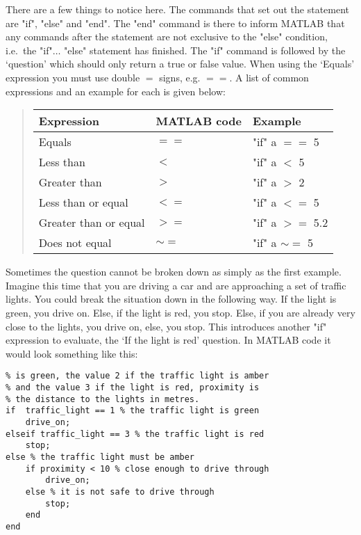 \documentclass[12pt,a4paper]{article}
\begin{document}
There are a few things to notice here.  The commands that set out the statement are "if", "else" and "end".  
The "end" command is there to inform MATLAB that any commands after the statement are not exclusive to the "else" condition, i.e.~the "if"$\ldots$ "else" statement has finished.  
The "if" command is followed by the `question' which should only return a true or false value.  
When using the `Equals' expression you must use double $=$ signs, e.g. $==$.  
A list of common expressions and an example for each is given below:

\begin{quotation}
\begin{tabular}{l l l}
\toprule
Expression & MATLAB code & Example \\
\midrule
Equals & $==$ & "if" a $==$ 5\\
Less than & $<$ & "if" a $<$ 5\\
Greater than & $>$ & "if" a $>$ 2\\
Less than or equal & $<=$ & "if" a $<=$ 5\\
Greater than or equal & $>=$ & "if" a $>=$ 5.2\\
Does not equal & $\sim =$ & "if" a $\sim =$ 5\\
\bottomrule
\end{tabular}
\end{quotation}

Sometimes the question cannot be broken down as simply as the first example.  
Imagine this time that you are driving a car and are approaching a set of traffic lights.  
You could break the situation down in the following way.  
If the light is green, you drive on.  
Else, if the light is red, you stop.  
Else, if you are already very close to the lights, you drive on, else, you stop.  This introduces another "if" expression to evaluate, the `If the light is red' question.  In MATLAB code it would look something like this:
\begin{lstlisting}[style=Matlab-editor]
% traffic_light has the value 1 when the traffic light 
% is green, the value 2 if the traffic light is amber 
% and the value 3 if the light is red, proximity is 
% the distance to the lights in metres.
if  traffic_light == 1 % the traffic light is green
    drive_on;
elseif traffic_light == 3 % the traffic light is red
    stop;
else % the traffic light must be amber
    if proximity < 10 % close enough to drive through
        drive_on;
    else % it is not safe to drive through
        stop;
    end
end
\end{lstlisting}
\end{document}
